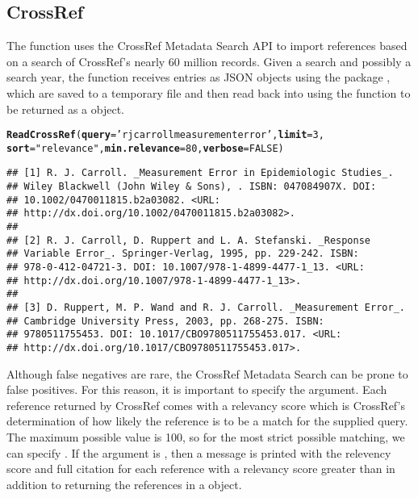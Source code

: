 \documentclass[article]{jss}\usepackage[]{graphicx}\usepackage[]{color}
\makeatletter
\newcommand{\hlnum}[1]{\textcolor[rgb]{0.125,0.125,1}{#1}}%
\newcommand{\hlstr}[1]{\textcolor[rgb]{0.125,0.125,1}{#1}}%
\newcommand{\hlstd}[1]{\textcolor[rgb]{0.251,0.251,0.282}{#1}}%
\newcommand{\hlkwc}[1]{\textcolor[rgb]{0.529,0,0.184}{\textbf{#1}}}%
\newcommand{\hlkwd}[1]{\textcolor[rgb]{0.251,0.251,0.282}{\textbf{#1}}}%
\newenvironment{kframe}{%
 \def\at@end@of@kframe{}%
 \ifinner\ifhmode%
  \def\at@end@of@kframe{\end{minipage}}%
  \begin{minipage}{\columnwidth}%
 \fi\fi%
 \def\FrameCommand##1{\hskip\@totalleftmargin \hskip-\fboxsep
 \colorbox{shadecolor}{##1}\hskip-\fboxsep
     \hskip-\linewidth \hskip-\@totalleftmargin \hskip\columnwidth}%
 \MakeFramed {\advance\hsize-\width
   \@totalleftmargin\z@ \linewidth\hsize
   \@setminipage}}%
 {\par\unskip\endMakeFramed%
 \at@end@of@kframe}
\newenvironment{knitrout}{}{} %
\makeatother
\begin{document}
\subsection{CrossRef}
The function  uses the CrossRef Metadata Search API to import references based on a search of CrossRef's nearly 60 million records.  Given a search and possibly a search year, the function receives \Bibtex{} entries as JSON objects using the  package \citep{RJSONIO}, which are saved to a temporary file and then read back into \R{} using the  function to be returned as a  object.
\begin{knitrout}
\color{fgcolor}\begin{kframe}
\begin{alltt}
\hlkwd{ReadCrossRef}\hlstd{(}\hlkwc{query} \hlstd{=} \hlstr{'rj carroll measurement error'}\hlstd{,} \hlkwc{limit} \hlstd{=} \hlnum{3}\hlstd{,}
             \hlkwc{sort} \hlstd{=} \hlstr{"relevance"}\hlstd{,} \hlkwc{min.relevance} \hlstd{=} \hlnum{80}\hlstd{,} \hlkwc{verbose} \hlstd{=} \hlnum{FALSE}\hlstd{)}
\end{alltt}
\begin{verbatim}
## [1] R. J. Carroll. _Measurement Error in Epidemiologic Studies_.
## Wiley Blackwell (John Wiley & Sons), . ISBN: 047084907X. DOI:
## 10.1002/0470011815.b2a03082. <URL:
## http://dx.doi.org/10.1002/0470011815.b2a03082>.
## 
## [2] R. J. Carroll, D. Ruppert and L. A. Stefanski. _Response
## Variable Error_. Springer-Verlag, 1995, pp. 229-242. ISBN:
## 978-0-412-04721-3. DOI: 10.1007/978-1-4899-4477-1_13. <URL:
## http://dx.doi.org/10.1007/978-1-4899-4477-1_13>.
## 
## [3] D. Ruppert, M. P. Wand and R. J. Carroll. _Measurement Error_.
## Cambridge University Press, 2003, pp. 268-275. ISBN:
## 9780511755453. DOI: 10.1017/CBO9780511755453.017. <URL:
## http://dx.doi.org/10.1017/CBO9780511755453.017>.
\end{verbatim}
\end{kframe}
\end{knitrout}


Although false negatives are rare, the CrossRef Metadata Search can be prone to false positives.  For this reason, it is important to specify the  argument.  Each reference returned by CrossRef comes with a relevancy score which is CrossRef's determination of how likely the reference is to be a match for the supplied query.  The maximum possible value is 100, so for the most strict possible matching, we can specify .  If the argument  is , then a message is printed with the relevency score and full citation for each reference with a relevancy score greater than  in addition to returning the references in a  object.
\end{document}
